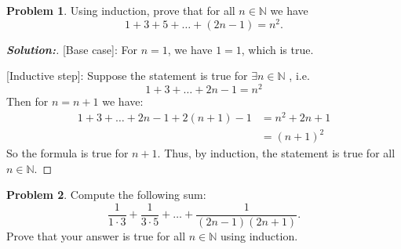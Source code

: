 \documentclass[12pt]{article}
\theoremstyle{definition}\newtheorem{problem}{Problem}
\newenvironment{solution}{\begin{proof}[\bfseries\textup{Solution:}]}{\end{proof}}
\begin{document}
\newpage
\begin{problem}
Using induction, prove that for all $n\in\mathbb{N}$ we have
\begin{equation*}
1+3+5+\dots+(2n-1) = n^2 .
\end{equation*}
\end{problem}

\begin{solution}

[Base case]: For $ n = 1 $, we have $ 1 =1 $, which is true. 

[Inductive step]: Suppose the statement is true for $ \exists n \in \mathbb{N}  $ , i.e. 
\begin{equation} 1+ 3+ \dots + 2n-1 = n^2 \end{equation}
 Then for $ n = n+1 $  we have: 
\begin{align}
    1+3+\dots + 2n-1 + 2(n+1)-1 &= n^2 + 2n+1 \\
    &= (n+1)^2
\end{align}
So the formula is true for $ n+1 $. Thus, by induction, the statement is true for all $ n \in \mathbb{N} $.

\end{solution}

\newpage
\begin{problem}
Compute the following sum:
\begin{equation*}
\frac{1}{1\cdot 3} + \frac{1}{3\cdot 5} + \dots + \frac{1}{(2n-1)(2n+1)} .
\end{equation*}
Prove that your answer is true for all $n\in\mathbb{N}$ using induction.
\end{problem}
\end{document}
